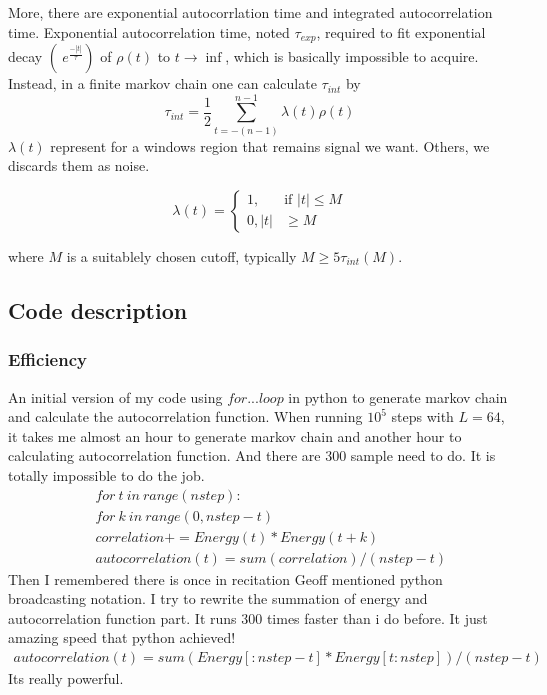\documentclass[12pt]{article}
\begin{document}
More, there are exponential autocorrlation time and integrated autocorrelation time. Exponential autocorrelation time, noted $\tau_{exp}$, required to fit exponential decay $(~e^{\frac{-|t|}{\tau}})$ of $\rho(t)$ to $t\rightarrow\inf$, which is basically impossible to acquire. Instead, in a finite markov chain one can calculate $\tau_{int}$ by 
\begin{equation}
	\tau_{int}=\frac{1}{2} \sum_{t=-(n-1)}^{n-1} \lambda(t) \rho(t)
\end{equation}
$\lambda(t)$ represent for a windows region that remains signal we want. Others, we discards them as 
noise.

\[
\lambda(t)= 
\begin{cases}
1,& \text{if } |t|\leq M\\
0,              |t|& \geq M
\end{cases}
\]

where $M$ is a suitablely chosen cutoff, typically $M\geq 5\tau_{int}(M)$.


\subsection{Code description}
\subsubsection{Efficiency}
An initial version of my code using $for...loop$ in python to generate markov chain  and calculate the autocorrelation function. When running $10^{5}$ steps with $L=64$, it takes me almost an hour to generate markov chain and another hour to calculating autocorrelation function. And there are 300 sample need to do. It is totally impossible to do the job. 
\begin{eqnarray}
&&for\ t\ in\ range(nstep):\nonumber\\
	&&for\ k\ in\ range(0, nstep-t)\nonumber\\
		&&correlation+= Energy(t)*Energy(t+k)\nonumber\\
	&&autocorrelation(t)=sum(correlation)/(nstep-t)
\end{eqnarray}
Then I remembered there is once in recitation Geoff mentioned python broadcasting notation. I try to rewrite the summation of energy and autocorrelation function part. It runs 300 times faster than i do before. It just amazing speed that python achieved!
\begin{eqnarray}
autocorrelation(t)=sum(Energy[:nstep-t]*Energy[t:nstep])/(nstep-t)
\end{eqnarray}
Its really powerful.
\end{document}
